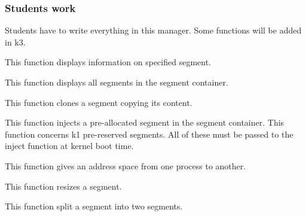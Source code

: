 \subsubsection{Students work}

Students have to write everything in this manager. Some functions will
be added in k3.


This function displays information on specified segment.


This function displays all segments in the segment container.


This function clones a segment copying its content.


This  function   injects  a  pre-allocated  segment   in  the  segment
container.  This function  concerns k1  pre-reserved segments.  All of
these must be passed to the inject function at kernel boot time.


This function gives an address space from one process to another.


This function resizes a segment.


This function split a segment into two segments.


